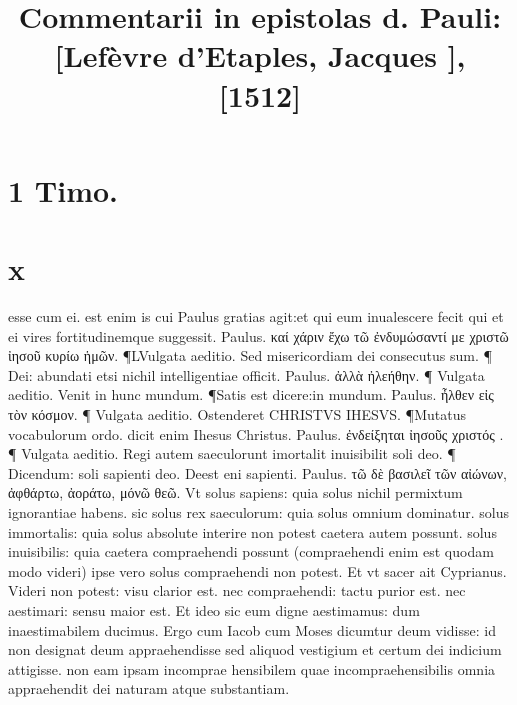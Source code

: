\documentclass{article}
\begin{document}
\date{}
        \title{Commentarii in epistolas d. Pauli: [Lefèvre d'Etaples, Jacques ], [1512]}
\maketitle
\tableofcontents
\clearpage
\begin{pages} 
\beginnumbering
        
\section*{1 Timo. }
\section*{x }
\marginpar{[ p.203 ]}\pstart esse cum ei. est enim is cui Paulus gratias agit:et qui eum inualescere fecit qui et ei vires fortitudinemque  suggessit. Paulus. καί χάριν ἔχω τῶ ἐνδυμώσαντί με χριστῶ ἰησοῦ   κυρίω ἡμῶν. ¶LVulgata aeditio. Sed misericordiam dei consecutus sum. ¶ Dei: abundati   etsi nichil intelligentiae officit. Paulus. ἀλλὰ ἠλεήθην. ¶ Vulgata aeditio. Venit in   hunc mundum. ¶Satis est dicere:in mundum. Paulus. ἦλθεν εἰς τὸν κόσμον. ¶ Vulgata aeditio. Ostenderet CHRISTVS IHESVS. ¶Mutatus vocabulorum ordo. dicit enim   Ihesus Christus. Paulus. ἐνδείξηται ἰησοῦς χριστός . ¶ Vulgata aeditio. Regi autem   saeculorunt imortalit inuisibilit soli deo. ¶ Dicendum: soli sapienti deo. Deest eni sapienti. Paulus.  τῶ δὲ βασιλεῖ τῶν αἰώνων, ἀφθάρτω, ἀοράτω, μόνῶ θεῶ. Vt solus sapiens: quia solus nichil permixtum ignorantiae habens. sic solus rex saeculorum: quia solus omnium dominatur. solus immortalis: quia solus absolute interire non potest caetera autem possunt. solus inuisibilis: quia caetera compraehendi possunt (compraehendi enim est quodam modo videri) ipse vero solus compraehendi non potest. Et vt sacer ait Cyprianus. Videri non potest: visu clarior est. nec compraehendi: tactu purior est. nec aestimari: sensu maior est. Et ideo sic eum digne aestimamus: dum inaestimabilem ducimus. Ergo cum Iacob cum Moses dicumtur deum vidisse: id non designat deum appraehendisse sed aliquod vestigium et certum dei indicium attigisse. non eam ipsam incomprae hensibilem quae incompraehensibilis omnia appraehendit dei naturam atque  substantiam.  \pend

\end{pages}
\end{document}
